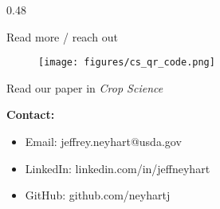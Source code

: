 \documentclass[final]{beamer}
\newlength{\twocolwid}
\begin{document}
\begin{frame}[t]
\begin{columns}[t]
\begin{column}{\twocolwid}


\vspace{2cm}


\begin{columns}[t,totalwidth=\twocolwid] %


\begin{column}{0.48\twocolwid}


\begin{alertblock}{Read more / reach out}

\begin{minipage}{0.3\linewidth}
\begin{figure}[H]
  \texttt{[image: figures/cs\_qr\_code.png]}
\end{figure}
\end{minipage} \hfill
\begin{minipage}{0.7\linewidth}
Read our paper in \textit{Crop Science}
\end{minipage}


\textbf{Contact:}
\begin{itemize}
  \item Email: jeffrey.neyhart@usda.gov
  \item LinkedIn: linkedin.com/in/jeffneyhart
  \item GitHub: github.com/neyhartj
\end{itemize}




\end{alertblock}
\end{column}
\end{columns}
\end{column}
\end{columns}
\end{frame}
\end{document}
